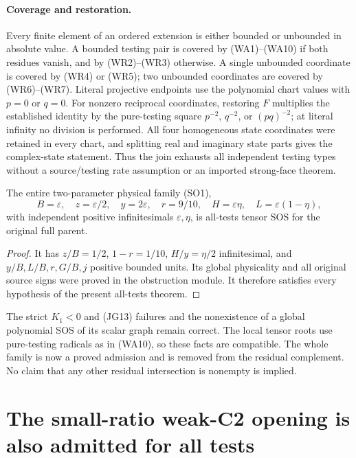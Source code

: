 \paragraph{Coverage and restoration.}
Every finite element of an ordered extension is either bounded or
unbounded in absolute value. A bounded testing pair is covered by
(WA1)--(WA10) if both residues vanish, and by (WR2)--(WR3)
otherwise. A single unbounded coordinate is covered by (WR4) or
(WR5); two unbounded coordinates are covered by (WR6)--(WR7).
Literal projective endpoints use the polynomial chart values with
$p=0$ or $q=0$. For nonzero reciprocal coordinates, restoring
$F$ multiplies the established identity by the pure-testing
square $p^{-2}$, $q^{-2}$, or $(pq)^{-2}$; at literal infinity
no division is performed. All four homogeneous state coordinates
were retained in every chart, and splitting real and imaginary
state parts gives the complex-state statement. Thus the join
exhausts all independent testing types without a source/testing
rate assumption or an imported strong-face theorem.

\begin{corollary}
The entire two-parameter physical family (SO1),
\[
 B=\varepsilon,\quad z=\varepsilon/2,\quad y=2\varepsilon,
 \quad r=9/10,\quad H=\varepsilon\eta,
 \quad L=\varepsilon(1-\eta),
\]
with independent positive infinitesimals $\varepsilon,\eta$, is
all-tests tensor SOS for the original full parent.
\end{corollary}
\begin{proof}
It has $z/B=1/2$, $1-r=1/10$, $H/y=\eta/2$ infinitesimal,
and $y/B,L/B,r,G/B,j$ positive bounded units. Its global
physicality and all original source signs were proved in the
obstruction module. It therefore satisfies every hypothesis of
the present all-tests theorem.
\end{proof}
The strict $K_1<0$ and (JG13) failures and the nonexistence of a
global polynomial SOS of its scalar graph remain correct.
The local tensor roots use pure-testing radicals as in (WA10),
so these facts are compatible. The whole family is now a proved
admission and is removed from the residual complement. No claim
that any other residual intersection is nonempty is implied.


\section{\texorpdfstring{The small-ratio weak-C2 opening is also admitted for all tests}{The small-ratio weak-C2 opening is also admitted for all tests}}
\label{component:p296e824cb97a}

